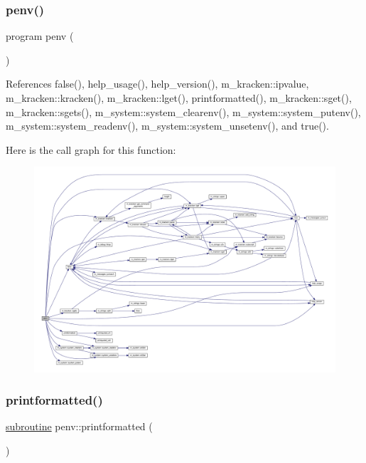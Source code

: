 \subsubsection{\texorpdfstring{penv()}{penv()}}
{\footnotesize\ttfamily program penv (\begin{DoxyParamCaption}{ }\end{DoxyParamCaption})}



References false(), help\+\_\+usage(), help\+\_\+version(), m\+\_\+kracken\+::ipvalue, m\+\_\+kracken\+::kracken(), m\+\_\+kracken\+::lget(), printformatted(), m\+\_\+kracken\+::sget(), m\+\_\+kracken\+::sgets(), m\+\_\+system\+::system\+\_\+clearenv(), m\+\_\+system\+::system\+\_\+putenv(), m\+\_\+system\+::system\+\_\+readenv(), m\+\_\+system\+::system\+\_\+unsetenv(), and true().

Here is the call graph for this function\+:
\nopagebreak
\begin{figure}[H]
\begin{center}
\leavevmode
\includegraphics[width=350pt]{penv_8f90_a01dea0dd27ab167506a724b2d0aeb2b5_cgraph}
\end{center}
\end{figure}
\mbox{\label{penv_8f90_a53f464ba778289ef53d33f9c0e2130c0}} 
\subsubsection{\texorpdfstring{printformatted()}{printformatted()}}
{\footnotesize\ttfamily \hyperlink{M__stopwatch_83_8txt_acfbcff50169d691ff02d4a123ed70482}{subroutine} penv\+::printformatted (\begin{DoxyParamCaption}{ }\end{DoxyParamCaption})}



